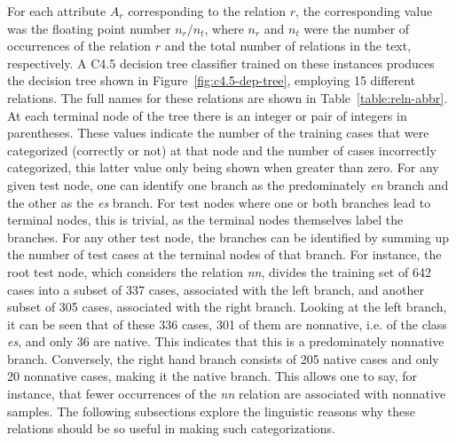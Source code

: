 \documentclass[main.tex]{subfiles}
\begin{document}
      For each attribute $A_r$ corresponding to the relation $r$, the corresponding value was the floating point number $n_r/n_t$, where $n_r$ and $n_t$ were the number of occurrences of the relation $r$ and the total number of relations in the text, respectively. A C4.5 decision tree classifier trained on these instances produces the decision tree shown in Figure~\ref{fig:c4.5-dep-tree}, employing 15 different relations. The full names for these relations are shown in Table~\ref{table:reln-abbr}. At each terminal node of the tree there is an integer or pair of integers in parentheses. These values indicate the number of the training cases that were categorized (correctly or not) at that node and the number of cases incorrectly categorized, this latter value only being shown when greater than zero. For any given test node, one can identify one branch as the predominately \textit{en} branch and the other as the \textit{es} branch. For test nodes where one or both branches lead to terminal nodes, this is trivial, as the terminal nodes themselves label the branches. For any other test node, the branches can be identified by summing up the number of test cases at the terminal nodes of that branch. For instance, the root test node, which considers the relation \textit{nn}, divides the training set of 642 cases into a subset of 337 cases, associated with the left branch, and another subset of 305 cases, associated with the right branch. Looking at the left branch, it can be seen that of these 336 cases, 301 of them are nonnative, i.e. of the class \textit{es}, and only 36 are native. This indicates that this is a predominately nonnative branch. Conversely, the right hand branch consists of 205 native cases and only 20 nonnative cases, making it the native branch. This allows one to say, for instance, that fewer occurrences of the \textit{nn} relation are associated with nonnative samples. The following subsections explore the linguistic reasons why these relations should be so useful in making such categorizations.
\end{document}
